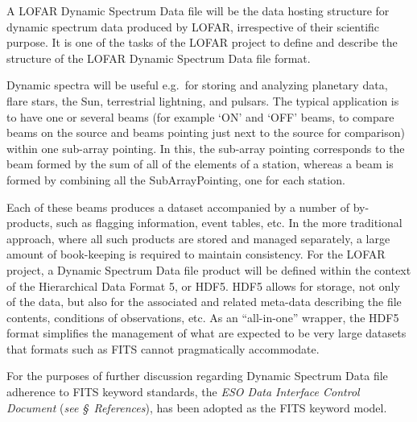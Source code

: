 \documentclass[a4paper,10pt,bibtotoc]{scrartcl}
\begin{document}
A LOFAR Dynamic Spectrum Data file will be the data hosting structure for dynamic
spectrum data produced by LOFAR, irrespective of their scientific purpose.
It is one of the tasks of the LOFAR project to define and describe the
structure of the LOFAR Dynamic Spectrum Data file format.

Dynamic spectra will be useful e.g.~for storing and analyzing planetary data, flare stars,
the Sun, terrestrial lightning, and pulsars. The typical application
is to have one or several beams (for example `ON' and `OFF' beams, to compare 
beams on the source and beams pointing just next to the source for comparison) 
within one
sub-array pointing. In this, the sub-array pointing corresponds to the beam formed by the sum of all of
the elements of a station, whereas a beam is formed by combining all the
SubArrayPointing, one for each station.

Each of these beams produces a dataset accompanied
by a number of by-products, such as flagging information, event
tables, etc. In the more traditional approach, where all such products
are stored and managed separately, a large amount of book-keeping is
required to maintain consistency. For the LOFAR project, a Dynamic
Spectrum Data file product will be defined within the context of the
Hierarchical Data Format 5, or HDF5. HDF5 allows for  storage, not
only of the data, but also for the associated and related meta-data
describing the file contents, conditions of observations, etc. As an
``all-in-one'' wrapper, the HDF5 format simplifies the management of
what are expected to be very large datasets that formats such as FITS
cannot pragmatically accommodate.



For the purposes of further discussion regarding Dynamic Spectrum Data file 
adherence to FITS
keyword standards, the \textit{ESO Data Interface Control Document} (\textit{see
\S\ References}), has been adopted as the FITS keyword model. 
\end{document}
